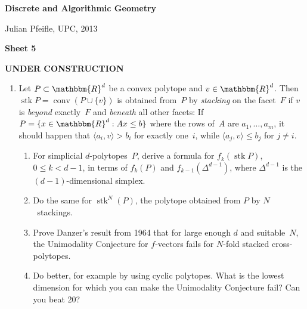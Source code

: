 \documentclass[11pt]{amsart}
\newcommand{\R}{\mathbbm{R}}
\DeclareMathOperator{\conv}{conv}
\DeclareMathOperator{\stack}{stk}
\begin{document}
\begin{center}
\textbf{\sffamily
   Discrete and Algorithmic Geometry }

\medskip
   Julian Pfeifle,
   UPC, 2013 \mbox{}
\end{center}

\bigskip

\begin{center}
  \textbf{\sffamily Sheet 5}

\bigskip
\textbf{\sffamily UNDER CONSTRUCTION}

\end{center}

\bigskip




\begin{enumerate}
\setlength{\itemsep}{1ex}
\item Let $P\subset\R^d$ be a convex polytope and $v\in\R^d$. Then $\stack P=\conv(P\cup\{v\})$ is obtained from~$P$ by \emph{stacking} on the facet~$F$ if $v$ is \emph{beyond} exactly~$F$ and \emph{beneath} all other facets: If $P=\{x\in\R^d: Ax\le b\}$ where the rows of~$A$ are $a_1,\dots, a_m$, it should happen that $\langle a_i,v\rangle > b_i$ for exactly one~$i$, while $\langle a_j,v\rangle \le b_j$ for  $j\ne i$.
\begin{enumerate}
\item For simplicial $d$-polytopes~$P$, derive a formula for $f_k(\stack P)$, $0\le k<d-1$,  in terms of $f_k(P)$ and $f_{k-1}(\Delta^{d-1})$, where $\Delta^{d-1}$ is the $(d-1)$-dimensional simplex.
\item Do the same for $\stack^{N}(P)$, the polytope obtained from $P$ by $N$~stackings.
\item Prove Danzer's result from 1964 that for large enough $d$ and suitable~$N$, the Unimodality Conjecture for $f$-vectors fails for $N$-fold stacked cross-polytopes.
\item Do better, for example by using cyclic polytopes. What is the lowest dimension for which you can make the Unimodality Conjecture fail? Can you beat 20?
\end{enumerate}

\end{enumerate}
\end{document}
